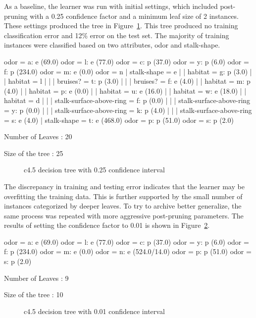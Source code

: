\documentclass{sig-alternate}
\begin{document}
As a baseline, the learner was run with initial settings, which included post-pruning with a 0.25 confidence factor and a minimum leaf size of 2 instances. These settings produced the tree in Figure~\ref{dt-c025}. This tree produced no training classification error and 12\% error on the test set. The majority of training instances were classified based on two attributes, odor and stalk-shape.

\small
\begin{verbbox}
odor = a: e (69.0)
odor = l: e (77.0)
odor = c: p (37.0)
odor = y: p (6.0)
odor = f: p (234.0)
odor = m: e (0.0)
odor = n
|   stalk-shape = e
|   |   habitat = g: p (3.0)
|   |   habitat = l
|   |   |   bruises? = t: p (3.0)
|   |   |   bruises? = f: e (4.0)
|   |   habitat = m: p (4.0)
|   |   habitat = p: e (0.0)
|   |   habitat = u: e (16.0)
|   |   habitat = w: e (18.0)
|   |   habitat = d
|   |   |   stalk-surface-above-ring = f: p (0.0)
|   |   |   stalk-surface-above-ring = y: p (0.0)
|   |   |   stalk-surface-above-ring = k: p (4.0)
|   |   |   stalk-surface-above-ring = s: e (4.0)
|   stalk-shape = t: e (468.0)
odor = p: p (51.0)
odor = s: p (2.0)

Number of Leaves  :     20

Size of the tree :  25
\end{verbbox}
\normalsize

\begin{figure}[!htbp]
    \centering
    \theverbbox
    \caption{c4.5 decision tree with 0.25 confidence interval \label{dt-c025}}
\end{figure}


The discrepancy in training and testing error indicates that the learner may be overfitting the training data. This is further supported by the small number of instances categorized by deeper leaves. To try to archive better generalize, the same process was repeated with more aggressive post-pruning parameters. The results of setting the confidence factor to 0.01 is shown in Figure~\ref{dt-c001}.

\small
\begin{verbbox}
odor = a: e (69.0)
odor = l: e (77.0)
odor = c: p (37.0)
odor = y: p (6.0)
odor = f: p (234.0)
odor = m: e (0.0)
odor = n: e (524.0/14.0)
odor = p: p (51.0)
odor = s: p (2.0)

Number of Leaves  :     9

Size of the tree :  10
\end{verbbox}
\normalsize

\begin{figure}[!htbp]
    \centering
    \theverbbox
    \caption{c4.5 decision tree with 0.01 confidence interval \label{dt-c001}}
\end{figure}
\end{document}
